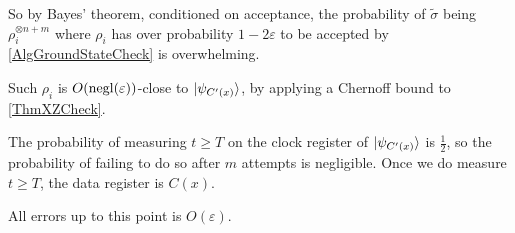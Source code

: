 \begin{prf}
	So by Bayes' theorem, conditioned on acceptance, the probability of $\tilde{\sigma}$ being $\rho_i^{\otimes n+m}$ where $\rho_i$ has over probability $1-2\varepsilon$ to be accepted by \cref{AlgGroundStateCheck} is overwhelming.

	Such $\rho_i$ is $O(\operatorname{negl}(\varepsilon))$-close to $\ket{\psi_{C'(x)}}$, by applying a Chernoff bound to \cref{ThmXZCheck}.

	The probability of measuring $t\geq T$ on the clock register of $\ket{\psi_{C'(x)}}$ is $\frac{1}{2}$, so the probability of failing to do so after $m$ attempts is negligible.
	Once we do measure $t\geq T$, the data register is $C(x)$.

	All errors up to this point is $O(\varepsilon)$.
\end{prf}

